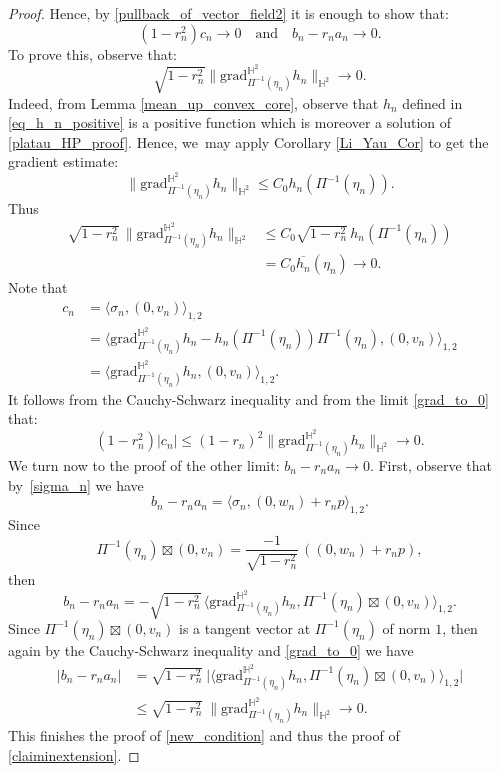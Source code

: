\documentclass[10pt]{amsart}
\theoremstyle{plain}
\theoremstyle{definition}
\newcommand{\grad}{\mathrm{grad}^{\mathbb{H}^2}}
\newcommand{\inner}[1] {\langle #1 \rangle}
\begin{document}
\begin{proof}
Hence, by \eqref{pullback_of_vector_field2} it is enough to show that:
\begin{equation}\label{new_condition}
(1 - r_n^2) c_n \to 0 \quad \text{and} \quad b_n - r_n a_n \to 0.
\end{equation}
To prove this, observe that:
\begin{equation}\label{grad_to_0}
\sqrt{1 - r_n^2} \lVert \grad_{\Pi^{-1}(\eta_n)} h_n \rVert_{\mathbb{H}^2} \to 0.
\end{equation}
Indeed, from Lemma \ref{mean_up_convex_core}, observe that \(h_n\) defined in \eqref{eq_h_n_positive} is a positive function which is moreover a solution of \eqref{platau_HP_proof}. Hence, we~may apply Corollary \ref{Li_Yau_Cor} to get the gradient estimate:
\[
\lVert \grad_{\Pi^{-1}(\eta_n)} h_n\rVert_{\mathbb{H}^2}\leq C_0 h_n(\Pi^{-1}(\eta_n)).
\]
Thus \begin{align*}
\sqrt{1-r_n^2}\,\lVert\grad_{\Pi^{-1}(\eta_n)} h_n\rVert_{\mathbb{H}^2}&\leq C_0\sqrt{1-r_n^2}\,h_n(\Pi^{-1}(\eta_n))\\
&=C_0\overline{h_n}(\eta_n)\to 0.
\end{align*}
Note that \begin{align*}
c_n&=\inner{\sigma_n,(0,v_n)}_{1,2}\\
&=\inner{\grad_{\Pi^{-1}(\eta_n)}h_n-h_n(\Pi^{-1}(\eta_n))\Pi^{-1}(\eta_n),(0,v_n)}_{1,2}\\
&= \inner{\grad_{\Pi^{-1}(\eta_n)}h_n,(0,v_n)}_{1,2}.
\end{align*} It follows from the Cauchy-Schwarz inequality and from the limit \eqref{grad_to_0} that:
\[
(1-r_n^2)\lvert c_n\rvert\leq (1-r_n)^2\lVert\grad_{\Pi^{-1}(\eta_n)}h_n\rVert_{\mathbb{H}^2} \to 0.
\]
We turn now to the proof of the other limit: $b_n-r_na_n\to 0$. First, observe that by~\eqref{sigma_n} we have
\[
b_n-r_na_n=\inner{\sigma_n,(0,w_n)+r_np}_{1,2}.
\]
Since
\[
\Pi^{-1}(\eta_n)\boxtimes(0,v_n)=\frac{-1}{\sqrt{1-r_n^2}}\,((0,w_n)+r_np),
\]
then
\[
b_n-r_na_n=-\sqrt{1-r_n^{2}}\,\inner{\grad_{\Pi^{-1}(\eta_n)}h_n,\Pi^{-1}(\eta_n)\boxtimes (0,v_n)}_{1,2}.
\]
Since $\Pi^{-1}(\eta_n)\boxtimes (0,v_n)$ is a tangent vector at $\Pi^{-1}(\eta_n)$ of norm $1$, then again by the Cauchy-Schwarz inequality and \eqref{grad_to_0} we have
\begin{align*}
\lvert b_n-r_na_n\rvert&=\sqrt{1-r_n^{2}}\ \lvert\inner{\grad_{\Pi^{-1}(\eta_n)}h_n,\Pi^{-1}(\eta_n)\boxtimes (0,v_n)}_{1,2}\vert\\
&\leq \sqrt{1-r_n^{2}}\ \lVert \grad_{\Pi^{-1}(\eta_n)}h_n\rVert_{\mathbb{H}^2}\to 0.
\end{align*}
This finishes the proof of \eqref{new_condition} and thus the proof of \eqref{claiminextension}.


\end{proof}
\end{document}
